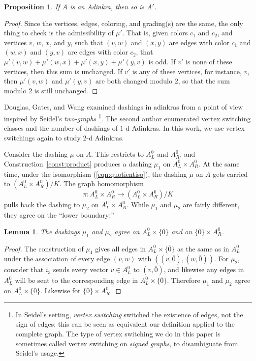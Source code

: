 \documentclass[12pt,twoside,singlespace]{article}
\numberwithin{equation}{section}
\newtheorem{lem}[equation]{Lemma}
\newtheorem{prop}[equation]{Proposition}
\theoremstyle{definition}
\begin{document}
\begin{prop}
\label{prop:switching-still-adinkra}
If $A$ is an Adinkra, then so is $A'$.
\end{prop}
\begin{proof}
Since the vertices, edges, coloring, and grading(s) are the same, the only thing to check is the admissibility of $\mu'$.  That is, given colors $c_1$ and $c_2$, and vertices $v$, $w$, $x$, and $y$, such that $(v,w)$ and $(x,y)$ are edges with color $c_1$ and $(w,x)$ and $(y,v)$ are edges with color $c_2$, that $\mu'(v,w)+\mu'(w,x)+\mu'(x,y)+\mu'(y,v)$ is odd.  If $v'$ is none of these vertices, then this sum is unchanged.  If $v'$ is any of these vertices, for instance, $v$, then $\mu'(v,w)$ and $\mu'(y,v)$ are both changed modulo $2$, so that the sum modulo $2$ is still unchanged.
\end{proof}

Douglas, Gates, and Wang \cite{douglas} examined dashings in adinkras from a point of view inspired by Seidel's \emph{two-graphs} \cite{seidel:survey} \footnote{In Seidel's setting, \emph{vertex switching} switched the existence of edges, not the sign of edges; this can be seen as equivalent our definition applied to the complete graph. The type of vertex switching we do in this paper is sometimes called vertex switching on \emph{signed graphs}, to disambiguate from Seidel's usage.}. The second author \cite{zhang:adinkras} enumerated vertex switching classes and the number of dashings of $1$-d Adinkras. In this work, we use vertex switchings again to study $2$-d Adinkras.

Consider the dashing $\mu$ on $A$.  This restricts to $A_L^0$ and $A_R^0$, and Construction~\ref{const:product} produces a dashing $\mu_1$ on $A_L^0\times A_R^0$. At the same time, under the isomorphism (\ref{eqn:quotientiso}), the dashing $\mu$ on $A$ gets carried to $(A_L^0\times A_R^0)/K$.  The graph homomorphism
\[\pi:A_L^0\times A_R^0\to (A_L^0\times A_R^0)/K\]
pulls back the dashing to $\mu_2$ on $A_L^0\times A_R^0$. While $\mu_1$ and $\mu_2$ are fairly different, they agree on the ``lower boundary:''

\begin{lem}
\label{lem:agree-on-boundary}
The dashings $\mu_1$ and $\mu_2$ agree on $A_L^0\times \{\overline{0}\}$ and on $\{\overline{0}\}\times A_R^0$.
\end{lem}
\begin{proof}
The construction of $\mu_1$ gives all edges in $A_L^0\times\{\overline{0}\}$ as the same as in $A_L^0$ under the association of every edge $(v,w)$ with $((v,\overline{0}),(w,\overline{0}))$.  For $\mu_2$, consider that $i_3$ sends every vector $v\in A_L^0$ to $(v,\overline{0})$, and likewise any edges in $A_L^0$ will be sent to the corresponding edge in $A_L^0\times\{\overline{0}\}$.  Therefore $\mu_1$ and $\mu_2$ agree on $A_L^0\times\{\overline{0}\}$.  Likewise for $\{0\}\times A_R^0$.
\end{proof}
\end{document}

